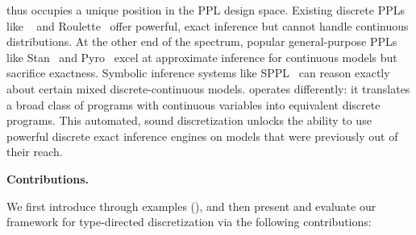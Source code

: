 \documentclass[acmsmall,screen,dvipsnames,x11names,nonacm,anonymous,review]{acmart}
\renewcommand{\paragraph}[1]{\vspace{1em}\noindent\textbf{#1}\ }
\newcommand{\Slice}{\text{\scshape Slice}\xspace}
\newcommand{\Dice}{\text{\scshape Dice}\xspace}
\begin{document}
\Slice thus occupies a unique position in the PPL design space. Existing discrete PPLs like \Dice~\cite{Holtzen2020Dice} and Roulette~\cite{Moy2025Roulette} offer powerful, exact inference but cannot handle continuous distributions. At the other end of the spectrum, popular general-purpose PPLs like Stan~\cite{Carpenter2017Stan} and Pyro~\cite{Bingham2019Pyro} excel at approximate inference for continuous models but sacrifice exactness. Symbolic inference systems like SPPL~\cite{Saad2021SPPL} can reason exactly about certain mixed discrete-continuous models. \Slice operates differently: it translates a broad class of programs with continuous variables into equivalent discrete programs. This automated, sound discretization unlocks the ability to use powerful discrete exact inference engines on models that were previously out of their reach.

\paragraph{Contributions.}

We first introduce \Slice through examples (), and then present and evaluate our framework for type-directed discretization via the following contributions:
\end{document}
